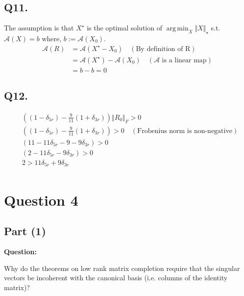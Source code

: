 \documentclass[fleqn, 11pt]{article}
\DeclareMathOperator*{\argmin}{arg\,min}
\begin{document}
\subsection*{Q11.}
The assumption is that $X^\star$ is the optimal solution of $\argmin_X \Vert X \Vert_\star$ s.t. $\mathcal{A}(X) = b$ where, $b := \mathcal{A}(X_0)$.
\begin{equation*}
    \begin{aligned}
        \mathcal{A}(R) &= \mathcal{A}(X^\star - X_0) \quad (\text{By definition of R}) \\
            &= \mathcal{A}(X^\star) - \mathcal{A}(X_0) \quad (\text{$\mathcal{A}$ is a linear map}) \\
            &= b - b = 0
    \end{aligned}
\end{equation*}

\subsection*{Q12.}
\begin{equation*}
    \begin{aligned}
        & \left( (1 - \delta_{5r}) - \frac{9}{11}(1 + \delta_{3r}) \right) \Vert R_0 \Vert_F > 0 \\
        & \left( (1 - \delta_{5r}) - \frac{9}{11}(1 + \delta_{3r}) \right) > 0 \quad (\text{Frobenius norm is non-negative}) \\
        & (11 - 11\delta_{5r} - 9 - 9\delta_{3r}) > 0 \\
        & (2 - 11\delta_{5r} - 9\delta_{3r}) > 0 \\
        & 2 > 11\delta_{5r} + 9\delta_{3r} \\
    \end{aligned}
\end{equation*}


\newpage
\section*{Question 4}
\setcounter{equation}{0}

\subsection*{Part (1)}

\textbf{Question: }

\smallskip

Why do the theorems on low rank matrix completion require that the
singular vectors be incoherent with the canonical basis (i.e. columns of the identity matrix)?
\end{document}
